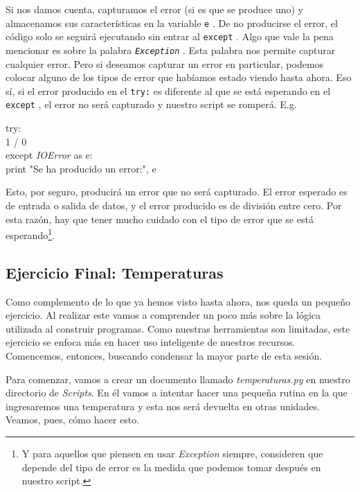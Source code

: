 \documentclass[10pt,letterpaper]{article}
\newcommand{\inlinecode}[1]{
\colorbox{light-gray}{\texttt{#1}}
}
\newenvironment{Code}
{
\begin{lrbox}{\selvestebox}%
\begin{minipage}{\dimexpr\columnwidth-2\fboxsep\relax}
\fontfamily{\ttdefault}\selectfont
}
{\end{minipage}\end{lrbox}%
\begin{center}
\colorbox{light-gray}{\usebox{\selvestebox}}
\end{center}
}
\begin{document}
Si nos damos cuenta, capturamos el error (si es que se produce uno) y almacenamos sus caracter\'isticas en la variable \inlinecode{e}. De no producirse el error, el c\'odigo solo se seguir\'a ejecutando sin entrar al \inlinecode{except}. Algo que vale la pena mencionar es sobre la palabra \inlinecode{\textit{Exception}}. Esta palabra nos permite capturar cualquier error. Pero si deseamos capturar un error en particular, podemos colocar alguno de los tipos de error que hab\'iamos estado viendo hasta ahora. Eso s\'i, si el error producido en el \inlinecode{try:} es diferente al que se est\'a esperando en el \inlinecode{except}, el error no ser\'a capturado y nuestro script se romper\'a. E.g.

\begin{Code}
try:\\
\hspace*{4mm} 1 / 0\\
except \textit{IOError} as e:\\
\hspace*{4mm} print "Se ha producido un error:", e
\end{Code}

Esto, por seguro, producir\'a un error que no ser\'a capturado. El error esperado es de entrada o salida de datos, y el error producido es de divisi\'on entre cero. Por esta raz\'on, hay que tener mucho cuidado con el tipo de error que se est\'a esperando\footnote{Y para aquellos que piensen en usar \textit{Exception} siempre, consideren que depende del tipo de error es la medida que podemos tomar despu\'es en nuestro script.}.

\subsection{Ejercicio Final: Temperaturas}
Como complemento de lo que ya hemos visto hasta ahora, nos queda un peque\~no ejercicio. Al realizar este vamos a comprender un poco m\'as sobre la l\'ogica utilizada al construir programas. Como nuestras herramientas son limitadas, este ejercicio se enfoca m\'as en hacer uso inteligente de nuestros recursos. Comencemos, entonces, buscando condensar la mayor parte de esta sesi\'on.

Para comenzar, vamos a crear un documento llamado \textit{temperaturas.py} en nuestro directorio de \textit{Scripts}. En \'el vamos a intentar hacer una peque\~na rutina en la que ingresaremos una temperatura y esta nos ser\'a devuelta en otras unidades. Veamos, pues, c\'omo hacer esto.\\
\end{document}
